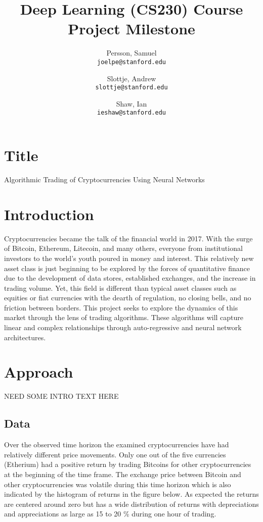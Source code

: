 \documentclass{article}
\title{Deep Learning (CS230) Course Project Milestone}
\author{
  Persson, Samuel\\
  \texttt{joelpe@stanford.edu}
  \and
  Slottje, Andrew\\
  \texttt{slottje@stanford.edu}
  \and
  Shaw, Ian\\
  \texttt{ieshaw@stanford.edu}
}
\begin{document}
\maketitle

\section*{Title}
\begin{center}
 Algorithmic Trading of Cryptocurrencies Using Neural Networks
 \end{center}
\section{Introduction}

Cryptocurrencies became the talk of the financial world in 2017. With the surge of Bitcoin, Ethereum, Litecoin, and many others, everyone from institutional investors to the world's youth poured in money and interest. This relatively new asset class is just beginning to be explored by the forces of quantitative finance due to the development of data stores, established exchanges, and the increase in trading volume. Yet, this field is different than typical asset classes such as equities or fiat currencies with the dearth of regulation, no closing bells, and no friction between borders. This project seeks to explore the dynamics of this market through the lens of trading algorithms. These algorithms will capture linear and complex relationships through auto-regressive and neural network architectures. 


\section{Approach}
NEED SOME INTRO TEXT HERE
\subsection{Data}
Over the observed time horizon the examined cryptocurrencies have had relatively different price movements. Only one out of the five currencies (Etherium) had a positive return by trading Bitcoins for other cryptocurrencies at the beginning of the time frame. The exchange price between Bitcoin and other cryptocurrencies was volatile during this time horizon which is also indicated by the histogram of returns in the figure below. As expected the returns are centered around zero but has a wide distribution of returns with depreciations and appreciations as large as 15 to 20 \% during one hour of trading. 
\end{document}

